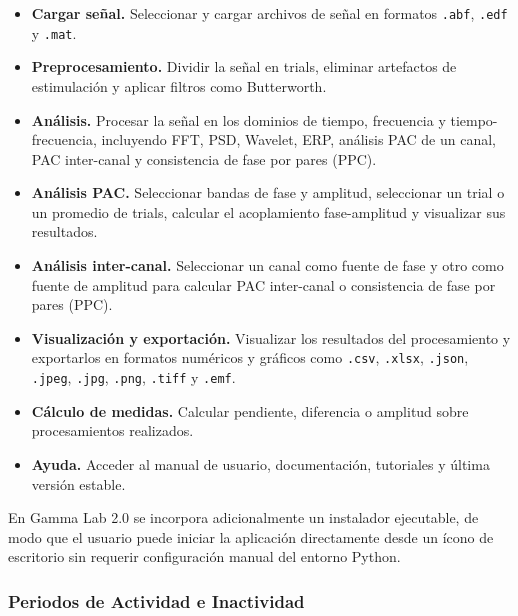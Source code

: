 \documentclass[12pt, letterpaper]{article}
\begin{document}
\begin{itemize}

    \item \textbf{Cargar señal.} Seleccionar y cargar archivos de señal en
    formatos \texttt{.abf}, \texttt{.edf} y \texttt{.mat}.

    \item \textbf{Preprocesamiento.} Dividir la señal en trials, eliminar
    artefactos de estimulación y aplicar filtros como Butterworth.

    \item \textbf{Análisis.} Procesar la señal en los dominios de tiempo,
    frecuencia y tiempo-frecuencia, incluyendo FFT, PSD, Wavelet, ERP,
    análisis PAC de un canal, PAC inter-canal y consistencia de fase por pares (PPC).

    \item \textbf{Análisis PAC.} Seleccionar bandas de fase y amplitud,
    seleccionar un trial o un promedio de trials, calcular el
    acoplamiento fase-amplitud y visualizar sus resultados.

    \item \textbf{Análisis inter-canal.} Seleccionar un canal como fuente de
    fase y otro como fuente de amplitud para calcular PAC inter-canal o
    consistencia de fase por pares (PPC).

    \item \textbf{Visualización y exportación.} Visualizar los resultados del
    procesamiento y exportarlos en formatos numéricos y gráficos como
    \texttt{.csv}, \texttt{.xlsx}, \texttt{.json}, \texttt{.jpeg},
    \texttt{.jpg}, \texttt{.png}, \texttt{.tiff} y \texttt{.emf}.

    \item \textbf{Cálculo de medidas.} Calcular pendiente, diferencia o amplitud sobre
    procesamientos realizados.

    \item \textbf{Ayuda.} Acceder al manual de usuario, documentación,
    tutoriales y última versión estable.

\end{itemize}

En Gamma Lab 2.0 se incorpora adicionalmente un instalador ejecutable, de modo
que el usuario puede iniciar la aplicación directamente desde un ícono de
escritorio sin requerir configuración manual del entorno Python.

\subsubsection{Periodos de Actividad e Inactividad}
\end{document}
